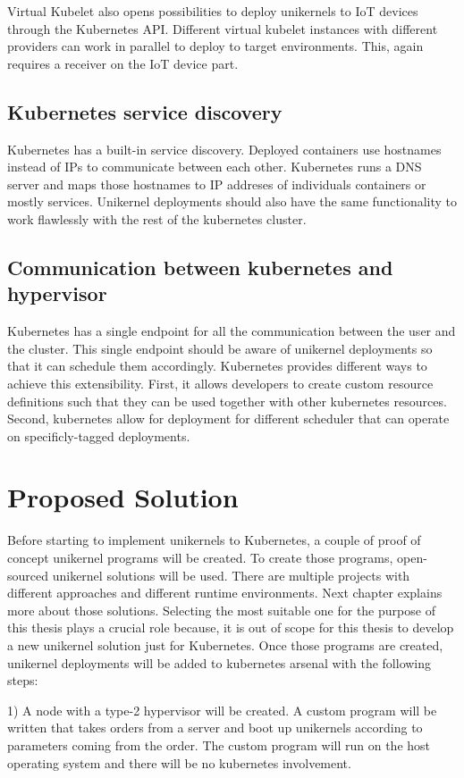 Virtual Kubelet also opens possibilities to deploy unikernels to IoT devices through the Kubernetes API. Different virtual kubelet instances with different providers can work in parallel to deploy to target environments. This, again requires a receiver on the IoT device part. 
\subsection{Kubernetes service discovery}
Kubernetes has a built-in service discovery. Deployed containers use hostnames instead of IPs to communicate between each other. Kubernetes runs a DNS server and maps those hostnames to IP addreses of individuals containers or mostly services. Unikernel deployments should also have the same functionality to work flawlessly with the rest of the kubernetes cluster. 

\subsection{Communication between kubernetes and hypervisor}
Kubernetes has a single endpoint for all the communication between the user and the cluster. This single endpoint should be aware of unikernel deployments so that it can schedule them accordingly. Kubernetes provides different ways to achieve this extensibility. First, it allows developers to create custom resource definitions such that they can be used together with other kubernetes resources. Second, kubernetes allow for deployment for different scheduler that can operate on specificly-tagged deployments. 

\section{Proposed Solution}

Before starting to implement unikernels to Kubernetes, a couple of proof of concept unikernel programs will be created. To create those programs, open-sourced unikernel solutions will be used. There are multiple projects with different approaches and different runtime environments. Next chapter explains more about those solutions. Selecting the most suitable one for the purpose of this thesis plays a crucial role because, it is out of scope for this thesis to develop a new unikernel solution just for Kubernetes. Once those programs are created, unikernel deployments will be added to kubernetes arsenal with the following steps:

1) A node with a type-2 hypervisor will be created. A custom program will be written that takes orders from a server and boot up unikernels according to parameters coming from the order. The custom program will run on the host operating system and there will be no kubernetes involvement.

